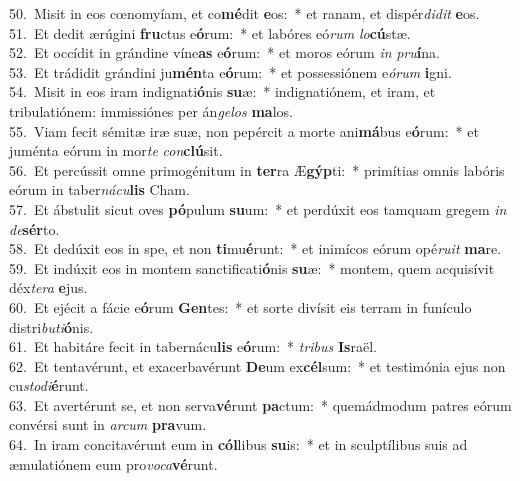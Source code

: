 {50.~}Misit in eos cœnomyíam, et co\textbf{mé}dit \textbf{e}os:~* et ranam, et dispér\textit{di}\textit{dit} \textbf{e}os.\\
{51.~}Et dedit ærúgini \textbf{fru}ctus e\textbf{ó}rum:~* et labóres eó\textit{rum} \textit{lo}\textbf{cú}stæ.\\
{52.~}Et occídit in grándine víne\textbf{as} e\textbf{ó}rum:~* et moros eórum \textit{in} \textit{pru}\textbf{í}na.\\
{53.~}Et trádidit grándini ju\textbf{mén}ta e\textbf{ó}rum:~* et possessiónem e\textit{ó}\textit{rum} \textbf{i}gni.\\
{54.~}Misit in eos iram indignati\textbf{ó}nis \textbf{su}æ:~* indignatiónem, et iram, et tribulatiónem: immissiónes per án\textit{ge}\textit{los} \textbf{ma}los.\\
{55.~}Viam fecit sémitæ iræ suæ, non pepércit a morte ani\textbf{má}bus e\textbf{ó}rum:~* et juménta eórum in mor\textit{te} \textit{con}\textbf{clú}sit.\\
{56.~}Et percússit omne primogénitum in \textbf{ter}ra Æ\textbf{gýp}ti:~* primítias omnis labóris eórum in taber\textit{ná}\textit{cu}\textbf{lis} Cham.\\
{57.~}Et ábstulit sicut oves \textbf{pó}pulum \textbf{su}um:~* et perdúxit eos tamquam gregem \textit{in} \textit{de}\textbf{sér}to.\\
{58.~}Et dedúxit eos in spe, et non \textbf{ti}mu\textbf{é}runt:~* et inimícos eórum opé\textit{ru}\textit{it} \textbf{ma}re.\\
{59.~}Et indúxit eos in montem sanctificati\textbf{ó}nis \textbf{su}æ:~* montem, quem acquisívit déx\textit{te}\textit{ra} \textbf{e}jus.\\
{60.~}Et ejécit a fácie e\textbf{ó}rum \textbf{Gen}tes:~* et sorte divísit eis terram in funículo distri\textit{bu}\textit{ti}\textbf{ó}nis.\\
{61.~}Et habitáre fecit in tabernácu\textbf{lis} e\textbf{ó}rum:~* \textit{tri}\textit{bus} \textbf{Is}raël.\\
{62.~}Et tentavérunt, et exacerbavérunt \textbf{De}um ex\textbf{cél}sum:~* et testimónia ejus non cu\textit{sto}\textit{di}\textbf{é}runt.\\
{63.~}Et avertérunt se, et non serva\textbf{vé}runt \textbf{pa}ctum:~* quemádmodum patres eórum convérsi sunt in \textit{ar}\textit{cum} \textbf{pra}vum.\\
{64.~}In iram concitavérunt eum in \textbf{cól}libus \textbf{su}is:~* et in sculptílibus suis ad æmulatiónem eum pro\textit{vo}\textit{ca}\textbf{vé}runt.\\
